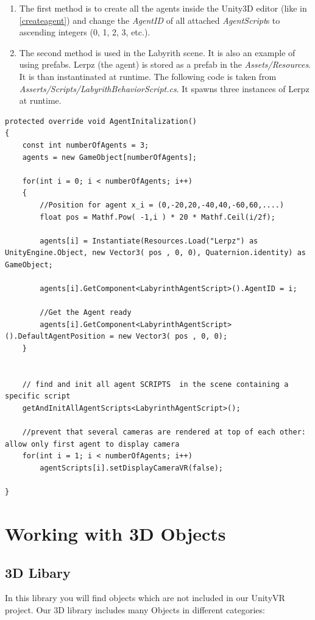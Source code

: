 \documentclass[10pt,final]{scrreprt}
\begin{document}
\begin{enumerate}
\item The first method is to create all the agents inside the Unity3D editor (like in \ref{createagent}) and change the \emph{AgentID} of all attached \emph{AgentScript}s to ascending integers (0, 1, 2, 3, etc.).
\item The second method is used in the Labyrith scene. It is also an example of using prefabs. Lerpz (the agent) is stored as a prefab in the \emph{Assets/Resources}. It is than instantinated
at runtime. The following code is taken from \emph{Asserts/Scripts/LabyrithBehaviorScript.cs}. It spawns three instances of Lerpz at runtime.
\end{enumerate}
\begin{lstlisting}
protected override void AgentInitalization()
{
	const int numberOfAgents = 3;	
	agents = new GameObject[numberOfAgents];

	for(int i = 0; i < numberOfAgents; i++)
	{
		//Position for agent x_i = (0,-20,20,-40,40,-60,60,....)	
		float pos = Mathf.Pow( -1,i ) * 20 * Mathf.Ceil(i/2f);
			
		agents[i] = Instantiate(Resources.Load("Lerpz") as UnityEngine.Object, new Vector3( pos , 0, 0), Quaternion.identity) as GameObject;

		agents[i].GetComponent<LabyrinthAgentScript>().AgentID = i;            	
							
		//Get the Agent ready
		agents[i].GetComponent<LabyrinthAgentScript>().DefaultAgentPosition = new Vector3( pos , 0, 0);			
	}	
		
		
	// find and init all agent SCRIPTS  in the scene containing a specific script
	getAndInitAllAgentScripts<LabyrinthAgentScript>();
		
	//prevent that several cameras are rendered at top of each other: allow only first agent to display camera		
	for(int i = 1; i < numberOfAgents; i++)
		agentScripts[i].setDisplayCameraVR(false);
		
}
\end{lstlisting}


\section{Working with 3D Objects}
\subsection{3D Libary}

In this library you will find objects which are not included in our UnityVR project.
Our 3D library includes many Objects in different categories:
\end{document}
